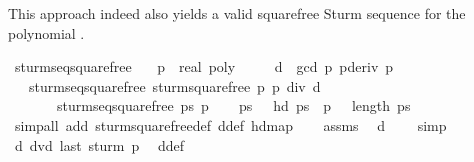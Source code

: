 \begin{isabellebody}
\begin{isamarkuptext}
This approach indeed also yields a valid squarefree Sturm sequence
  for the polynomial .%
\end{isamarkuptext}%
\isamarkuptrue%
\isamarkupfalse%
\ sturm{\isacharunderscore}seq{\isacharunderscore}squarefree{\isacharprime}{\isacharcolon}\isanewline
\ \ \ {\isachardoublequoteopen}{\isacharparenleft}p\ {\isacharcolon}{\isacharcolon}\ real\ poly{\isacharparenright}\ {\isasymnoteq}\ {}{\isachardoublequoteclose}\isanewline
\ \ \ {\isachardoublequoteopen}d\ {\isasymequiv}\ gcd\ p\ {\isacharparenleft}pderiv\ p{\isacharparenright}{\isachardoublequoteclose}\isanewline
\ \ \ {\isachardoublequoteopen}sturm{\isacharunderscore}seq{\isacharunderscore}squarefree\ {\isacharparenleft}sturm{\isacharunderscore}squarefree{\isacharprime}\ p{\isacharparenright}\ {\isacharparenleft}p\ div\ d{\isacharparenright}{\isachardoublequoteclose}\isanewline
\ \ \ \ \ \ {\isacharparenleft}\ {\isachardoublequoteopen}sturm{\isacharunderscore}seq{\isacharunderscore}squarefree\ {\isacharquery}ps{\isacharprime}\ {\isacharquery}p{\isacharprime}{\isachardoublequoteclose}{\isacharparenright}\isanewline
%
\isadelimproof
%
\endisadelimproof
%
\isatagproof
{}\isamarkupfalse%
\isanewline
\ \ \isamarkupfalse%
\ {\isachardoublequoteopen}{\isacharquery}ps{\isacharprime}\ {\isasymnoteq}\ {\isacharbrackleft}{\isacharbrackright}{\isachardoublequoteclose}\ {\isachardoublequoteopen}hd\ {\isacharquery}ps{\isacharprime}\ {\isacharequal}\ {\isacharquery}p{\isacharprime}{\isachardoublequoteclose}\ {\isachardoublequoteopen}{}\ {\isasymle}\ length\ {\isacharquery}ps{\isacharprime}{\isachardoublequoteclose}\isanewline
\ \ \ \ \ \ \isamarkupfalse%
\ {\isacharparenleft}simp{\isacharunderscore}all\ add{\isacharcolon}\ sturm{\isacharunderscore}squarefree{\isacharprime}{\isacharunderscore}def\ d{\isacharunderscore}def\ hd{\isacharunderscore}map{\isacharparenright}\isanewline
\isanewline
\ \ \isamarkupfalse%
\ assms\ \isamarkupfalse%
\ {\isachardoublequoteopen}d\ {\isasymnoteq}\ {}{\isachardoublequoteclose}\ \isamarkupfalse%
\ simp\isanewline
\ \ \isacommand{{\isacharbraceleft}}\isamarkupfalse%
\isanewline
\ \ \ \ \isamarkupfalse%
\ {\isachardoublequoteopen}d\ dvd\ last\ {\isacharparenleft}sturm\ p{\isacharparenright}{\isachardoublequoteclose}\ \isamarkupfalse%
\ d{\isacharunderscore}def\isanewline

\end{isabellebody}
